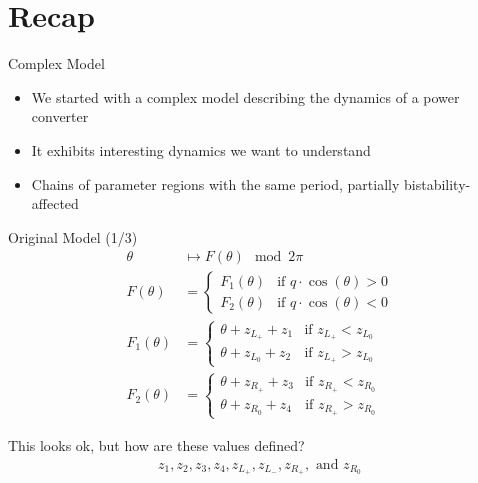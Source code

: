 \section{Recap}

\begin{frame}{Complex Model}
	\begin{itemize}
		\item We started with a complex model describing the dynamics of a power converter
		\item It exhibits interesting dynamics we want to understand
		\item Chains of parameter regions with the same period, partially bistability-affected
	\end{itemize}
	\vspace{-1em}
	\begin{figure}
	\end{figure}
\end{frame}

\begin{frame}{Original Model (1/3)}
	\vspace{-2.0em}
	\begin{align}
		\theta      & \mapsto  F(\theta) \mod 2 \pi
		\\
		F(\theta)   & = \begin{cases}
			                F_1(\theta) & \text{if } q \cdot \cos(\theta) > 0 \\
			                F_2(\theta) & \text{if } q \cdot \cos(\theta) < 0
		                \end{cases}
		\\
		F_1(\theta) & = \begin{cases}
			                \theta + z_{L_+} + z_1 & \text{if } z_{L_+} < z_{L_0} \\
			                \theta + z_{L_0} + z_2 & \text{if } z_{L_+} > z_{L_0}
		                \end{cases}
		\\
		F_2(\theta) & = \begin{cases}
			                \theta + z_{R_+} + z_3 & \text{if } z_{R_+} < z_{R_0} \\
			                \theta + z_{R_0} + z_4 & \text{if } z_{R_+} > z_{R_0}
		                \end{cases}
	\end{align}

	\pause
	\vspace{2em}
	This looks ok, but how are these values defined?
	\begin{align*}
		z_1, z_2, z_3, z_4, z_{L_+}, z_{L_-}, z_{R_+}, \text{ and } z_{R_0}
	\end{align*}
\end{frame}

